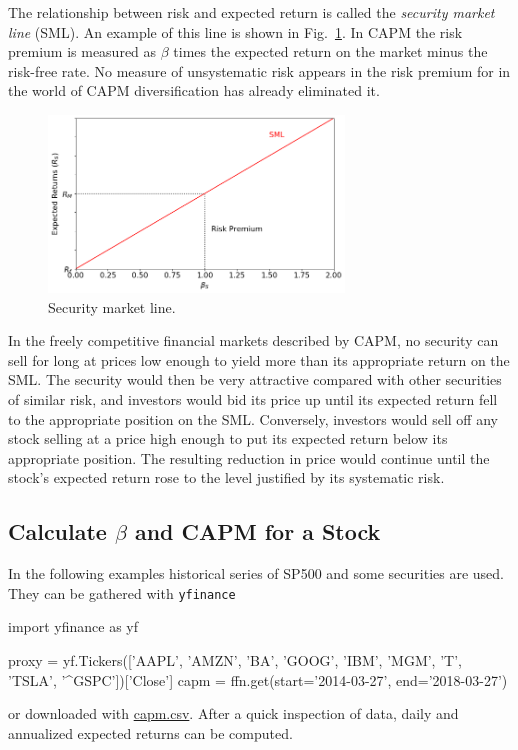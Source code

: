 The relationship between risk and expected return is called the \emph{security market line} (SML). An example of this line is shown in Fig.~\ref{fig:sml}. %
In CAPM the risk premium is measured as $\beta$ times the expected return on the market minus the risk-free rate. No measure of unsystematic risk appears in the risk premium for in the world of CAPM diversification has already eliminated it.

\begin{figure}[htb]
	\centering
	\includegraphics[width=0.7\textwidth]{figures/sml}
	\caption{Security market line.}
	\label{fig:sml}
\end{figure}

In the freely competitive financial markets described by CAPM, no security can sell for long at prices low enough to yield more than its appropriate return on the SML. The security would then be very attractive compared with other securities of similar risk, and investors would bid its price up until its expected return fell to the appropriate position on the SML. Conversely, investors would sell off any stock selling at a price high enough to put its expected return below its appropriate position. The resulting reduction in price would continue until the stock’s expected return rose to the level justified by its systematic risk.

\subsection{Calculate $\beta$ and CAPM for a Stock}

In the following examples historical series of SP500 and some securities are used. They can be gathered with \texttt{yfinance}

\begin{ipython}
import yfinance as yf

proxy = yf.Tickers(['AAPL', 'AMZN', 'BA', 'GOOG', 'IBM', 'MGM', 
                    'T', 'TSLA', '^GSPC'])['Close']
capm = ffn.get(start='2014-03-27', end='2018-03-27')
\end{ipython}
\noindent
or downloaded with \href{https://raw.githubusercontent.com/matteosan1/finance_course/develop/libro/input_files/capm.csv}{capm.csv}.
After a quick inspection of data, daily and annualized expected returns can be computed.

